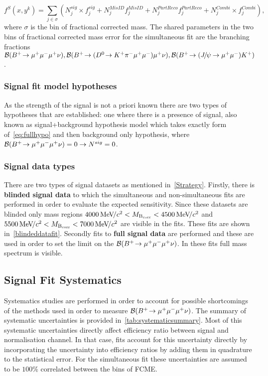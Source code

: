 \begin{equation}
f^{S}(x,y^{k})=\sum_{j\in{\sigma}}(N_{j}^{sig}\times f_{j}^{sig} + N_{j}^{MisID}f_{j}^{MisID} + N_{j}^{PartReco}f_{j}^{PartReco} + N_{j}^{Combi} \times f_{j}^{Combi}),
\label{eq:fullhypo2}
\end{equation}
where $\sigma$ is the bin of fractional corrected mass. The shared parameters in the two bins of fractional corrected mass error for the simultaneous fit are the branching fractions $\mathcal{B}({{{B}^+}}\!\rightarrow {\ensuremath{\mu^+\mu^-\mu^+}}\nu),\mathcal{B}({{{B}^+}}\!\rightarrow ({{D}^0}\!\rightarrow {\ensuremath{{K}^+}}{\ensuremath{{\pi}^-}}{\ensuremath{\mu^+\mu^-}}){\mu^+}\nu),\mathcal{B}({{{B}^+}}\!\rightarrow ({{J\mskip -3mu/\mskip -2mu\psi\mskip 2mu}}\!\rightarrow {\ensuremath{\mu^+\mu^-}}){{K}^+})$. 

\subsubsection{Signal fit model hypotheses}
As the strength of the signal is not a priori known there are two types of hypotheses that are established: one where there is a presence of signal, also known as signal+background hypothesis model which takes exactly form of~\autoref{eq:fullhypo} and then background only hypothesis, where $\mathcal{B}({{{B}^+}}\!\rightarrow {\ensuremath{\mu^+\mu^-\mu^+}}\nu)=0 \rightarrow N^{sig}=0$.

\subsubsection{Signal data types}

There are two types of signal datasets as mentioned in~\autoref{Strategy}. Firstly, there is \textbf{blinded signal data} to which the simultaneous and non-simultaneous fits are performed in order to evaluate the expected sensitivity. Since these datasets are blinded only mass regions $4000{{\mathrm{\,Me\kern -0.1em V\!/}c^2}}<M_{\rm{B_{corr}}}<{4500{\mathrm{\,Me\kern -0.1em V\!/}c^2}}$ and $5500{{\mathrm{\,Me\kern -0.1em V\!/}c^2}}<M_{\rm{B_{corr}}}<{7000{\mathrm{\,Me\kern -0.1em V\!/}c^2}}$ are visible in the fits. These fits are shown in~\autoref{blindeddatafit}. Secondly fits to \textbf{full signal data} are performed and these are used in order to set the limit on the $\mathcal{B}({{{B}^+}}\!\rightarrow {\ensuremath{\mu^+\mu^-\mu^+}}\nu)$. In these fits full mass spectrum is visible.

\subsection{Signal Fit Systematics}
\label{systematics}
Systematics studies are performed in order to account for possible shortcomings of the methods used in order to measure $\mathcal{B}({{{B}^+}}\!\rightarrow {\ensuremath{\mu^+\mu^-\mu^+}}\nu)$. The summary of systematic uncertainties is provided in~\autoref{tab:systematicsummary}. Most of this systematic uncertainties directly affect efficiency ratio between signal and normalisation channel. In that case, fits account for this uncertainty directly by incorporating the uncertainty into efficiency ratios by adding them in quadrature to the statistical error. For the simultaneous fit these uncertainties are assumed to be $100\%$ correlated between the bins of FCME.


